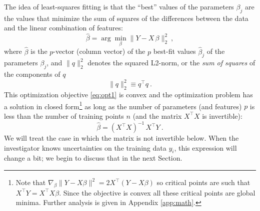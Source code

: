 \documentclass[12pt,letterpaper]{article}
\newcommand{\sectionname}{Section}
\begin{document}
The idea of least-squares fitting is that the ``best'' values of the parameters $\beta_j$ are the values that minimize the sum of squares of the differences between the data and the linear combination of features:
\begin{equation}\label{eq:opt1}
    \hat{\beta} = \arg\min_\beta \|Y - X\,\beta\|_2^2
    ~,
\end{equation}
where $\hat{\beta}$ is the $p$-vector (column vector) of the $p$ best-fit values $\hat{\beta}_j$ of the parameters $\beta_j$, and $\|q\|_2^2$ denotes the squared L2-norm, or the \emph{sum of squares} of the components of $q$
\begin{equation}
    \|q\|_2^2 \equiv q^\top q
    ~.
\end{equation}
This optimization objective \eqref{eq:opt1} is convex and the optimization problem has a solution in closed form\footnote{
Note that $\nabla_{\beta} \|Y-X\beta\|^2 = 2X^\top(Y-X\beta)$ so critical points are such that $X^\top Y= X^\top X\beta$. Since the objective is convex all these critical points are global minima. Further analysis is given in Appendix \ref{app:math}.
} as long as the number of parameters (and features) $p$ is less than the number of training points $n$ (and the matrix $X^\top X$ is invertible):
\begin{equation}
    \hat{\beta} = (X^\top X)^{-1}\,X^\top Y
    ~.
    \label{OLS-under}
\end{equation}
We will treat the case in which the matrix is not invertible below.
When the investigator knows uncertainties on the training data $y_i$, this expression will change a bit; we begin to discuss that in the next \sectionname.
\end{document}
